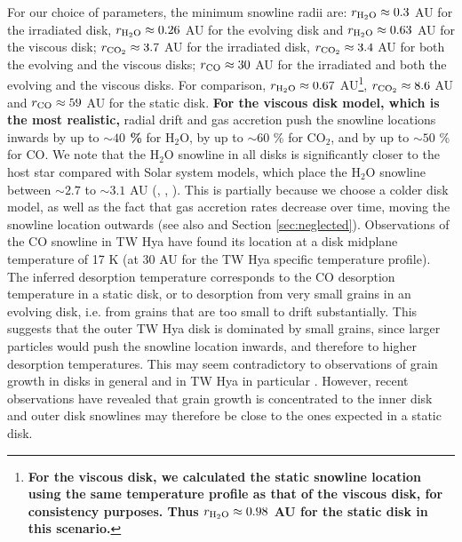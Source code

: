 \documentclass[apj]{emulateapj}
\newcommand{\emgr}[1]{\emph{ \color{gray} #1}}
\begin{document}
For our choice of parameters, the minimum snowline radii are: $r_{\rm{H_2O}} \approx 0.3$ AU for the irradiated disk, $r_{\rm{H_2O}} \approx 0.26$ AU for the evolving disk and $r_{\rm{H_2O}} \approx 0.63$ AU for the viscous disk; $r_{\rm{CO_2}} \approx 3.7$ AU for the irradiated disk, $r_{\rm{CO_2}} \approx 3.4$ AU for both the evolving and the viscous disks; $r_{\rm{CO}} \approx 30$ AU for the irradiated and both the evolving and the viscous disks. For comparison, $r_{\rm{H_2O}} \approx 0.67$ AU\footnote{\textbf{For the viscous disk, we calculated the static snowline location using the same temperature profile as that of the viscous disk, for consistency purposes. Thus $r_{\rm{H_2O}} \approx 0.98$ AU for the static disk in this scenario.}}, $r_{\rm{CO_2}} \approx 8.6$ AU and $r_{\rm{CO}} \approx 59$ AU for the static disk. \textbf{For the viscous disk model, which is the most realistic,} radial drift and gas accretion push the snowline locations inwards by up to \textbf{$\sim$$40$ \%} for H$_2$O, by up to  $\sim$$60$ \% for CO$_2$, and by up to $\sim$$50$ \% for CO.  We note that the H$_2$O snowline in all disks is significantly closer to the host star compared with Solar system models, which place the H$_2$O snowline between $\sim$$2.7$ to $\sim$$3.1$ AU (\citealt{hayashi81}, \citealt{podolak04}, \citealt{martin12}). This is partially because we choose a colder disk model, as well as the fact that gas accretion rates decrease over time, moving the snowline location outwards (see also \citealt{garaud07} and Section \ref{sec:neglected}). Observations of the CO snowline in TW Hya \citep{qi13} have found its location at a disk midplane temperature of 17 K (at 30 AU for the TW Hya specific temperature profile). The inferred  desorption temperature corresponds to the CO desorption temperature in a static disk, or to desorption from very small grains in an evolving disk, i.e. from grains that are too small to drift substantially. This suggests that the outer TW Hya disk is dominated by small grains, since larger particles would push the snowline location inwards, and therefore to higher desorption temperatures. This may seem contradictory to observations of grain growth in disks in general and in TW Hya in particular \citep{wilner00}. However, recent observations have revealed that grain growth is concentrated to the inner disk \citep{perez12} and outer disk snowlines may therefore be close to the ones expected in a static disk.


\end{document}
